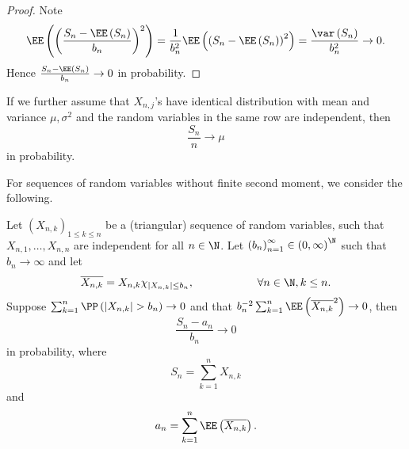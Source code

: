\documentclass[stat901]{subfiles}
\begin{document}
    \begin{proof}
        Note
        \begin{equation*}
            \EE\left( \left( \frac{S_n-\EE\left( S_n \right)}{b_n} \right)^{2} \right) = \frac{1}{b_n^{2}} \EE\left( \left( S_n-\EE\left( S_n \right) \right)^{2} \right) = \frac{\var\left( S_n \right)}{b_n^{2}} \to 0.
        \end{equation*}
        Hence $\frac{S_n-\EE\left( S_n \right)}{b_n}\to 0$ in probability.
    \end{proof}

    \np If we further assume that $X_{n,j}$'s have identical distribution with mean and variance $\mu,\sigma^{2}$ and the random variables in the same row are independent, then
    \begin{equation*}
        \frac{S_n}{n} \to \mu
    \end{equation*}
    in probability.
    
    \np For sequences of random variables without finite second moment, we consider the following.

    \begin{theorem}{}
        Let $\left( X_{n,k} \right)^{}_{1\leq k\leq n}$ be a (triangular) sequence of random variables, such that $X_{n,1},\ldots,X_{n,n}$ are independent for all $n\in\N$. Let $\left( b_{n} \right)^{\infty}_{n=1}\in\left( 0,\infty \right)^{\N}$ such that $b_n\to\infty$ and let
        \begin{equation*}
            \overline{X_{n,k}} = X_{n,k}\chi_{\left| X_{n,k} \right|\leq b_n}, \hspace{2cm}\forall n\in\N , k\leq n.
        \end{equation*}
        Suppose $\sum^{n}_{k=1} \PP\left( \left| X_{n,k} \right|>b_n \right) \to 0$ and that $b_n^{-2} \sum^{n}_{k=1}\EE\left( \overline{X_{n,k}}^{2} \right) \to 0$, then
        \begin{equation*}
            \frac{S_n-a_n}{b_n}\to 0
        \end{equation*}
        in probability, where
        \begin{equation*}
            S_n = \sum^{n}_{k=1} X_{n,k}
        \end{equation*}
        and
        \begin{equation*}
            a_n = \sum^{n}_{k=1} \EE\left( \overline{X_{n,k}} \right).
        \end{equation*}
    \end{theorem}
\end{document}
